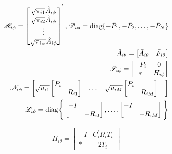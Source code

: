 \documentclass[conference]{IEEEtran}
\begin{document}
\begin{equation}\notag
	\begin{aligned}
		\mathscr{H}_{i\phi}=\begin{bmatrix}
			\sqrt{\pi_{i1}}\hat{A}_{i\phi}\\
			\sqrt{\pi_{i2}}\hat{A}_{i\phi}\\
			\vdots\\
			\sqrt{\pi_{i_N}}\hat{A}_{i\phi}
		\end{bmatrix}^{'},
		\mathscr{P}_{i\phi}=\mathrm{diag} \{-\bar{P}_{1},-\bar{P}_{2},\dots,-\bar{P}_{N}  \}\\
		\hat{A}_{i\theta}=\begin{bmatrix}
			\bar{A}_{i\theta}&\bar{F}_{i\theta}
		\end{bmatrix}  \\
		\mathscr{S}_{i\phi} = \begin{bmatrix}
			-P_{i}&0\\
			*&H_{i\phi}
		\end{bmatrix}\\
		\mathscr{N}_{i\phi}=\begin{bmatrix}
				\sqrt{u_{i1}}\begin{bmatrix}
				\bar{P}_{i}&\\
				&R_{i1}
			\end{bmatrix}&
			\dots&	
			\sqrt{u_{iM}}\begin{bmatrix}
				\bar{P}_{i}&\\
				&R_{iM}
			\end{bmatrix}&
		\end{bmatrix} \\
		\mathscr{L}_{i\phi}=\mathrm{diag}\Bigg\{\begin{bmatrix}
			-I&\\
			&-R_{i1}
		\end{bmatrix},\dots,
		\begin{bmatrix}
			-I&\\
			&-R_{iM}
		\end{bmatrix}  \Bigg\}
	\end{aligned}
\end{equation}



\begin{equation*}
H_{i\theta}=\begin{bmatrix}
-I&C^{'}_{i}\varOmega_{i}T_{i} \\
*&-2T_{i}
\end{bmatrix}
\end{equation*}
\end{document}
